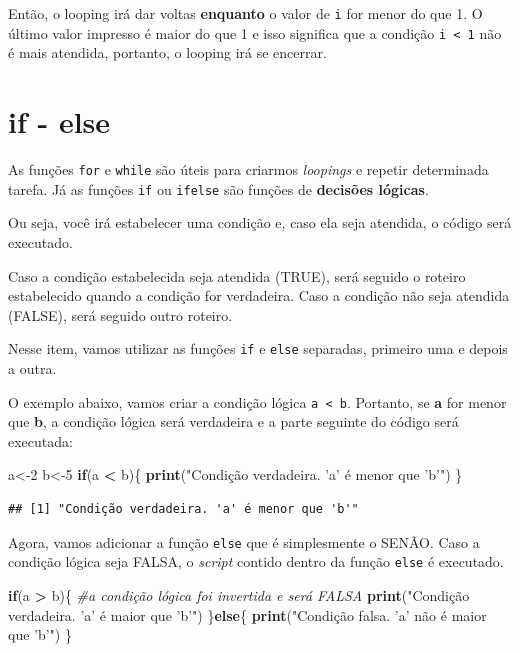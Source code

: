 \documentclass[
]{book}
\newenvironment{Shaded}{\begin{snugshade}}{\end{snugshade}}
\newcommand{\CommentTok}[1]{\textcolor[rgb]{0.56,0.35,0.01}{\textit{#1}}}
\newcommand{\ControlFlowTok}[1]{\textcolor[rgb]{0.13,0.29,0.53}{\textbf{#1}}}
\newcommand{\DecValTok}[1]{\textcolor[rgb]{0.00,0.00,0.81}{#1}}
\newcommand{\KeywordTok}[1]{\textcolor[rgb]{0.13,0.29,0.53}{\textbf{#1}}}
\newcommand{\NormalTok}[1]{#1}
\newcommand{\OperatorTok}[1]{\textcolor[rgb]{0.81,0.36,0.00}{\textbf{#1}}}
\newcommand{\StringTok}[1]{\textcolor[rgb]{0.31,0.60,0.02}{#1}}
\begin{document}
Então, o looping irá dar voltas \textbf{enquanto} o valor de \texttt{i}
for menor do que 1. O último valor impresso é maior do que 1 e isso
significa que a condição \texttt{i\ \textless{}\ 1} não é mais atendida,
portanto, o looping irá se encerrar.

\hypertarget{if---else}{%
\section{if - else}\label{if---else}}

As funções \texttt{for} e \texttt{while} são úteis para criarmos
\emph{loopings} e repetir determinada tarefa. Já as funções \texttt{if}
ou \texttt{ifelse} são funções de \textbf{decisões lógicas}.

Ou seja, você irá estabelecer uma condição e, caso ela seja atendida, o
código será executado.

Caso a condição estabelecida seja atendida (TRUE), será seguido o
roteiro estabelecido quando a condição for verdadeira. Caso a condição
não seja atendida (FALSE), será seguido outro roteiro.

Nesse item, vamos utilizar as funções \texttt{if} e \texttt{else}
separadas, primeiro uma e depois a outra.

O exemplo abaixo, vamos criar a condição lógica
\texttt{a\ \textless{}\ b}. Portanto, se \textbf{a} for menor que
\textbf{b}, a condição lógica será verdadeira e a parte seguinte do
código será executada:

\begin{Shaded}
\begin{Highlighting}[]
\NormalTok{a<-}\DecValTok{2}
\NormalTok{b<-}\DecValTok{5}
\ControlFlowTok{if}\NormalTok{(a }\OperatorTok{<}\StringTok{ }\NormalTok{b)\{}
  \KeywordTok{print}\NormalTok{(}\StringTok{"Condição verdadeira. 'a' é menor que 'b'"}\NormalTok{)}
\NormalTok{\}}
\end{Highlighting}
\end{Shaded}

\begin{verbatim}
## [1] "Condição verdadeira. 'a' é menor que 'b'"
\end{verbatim}

Agora, vamos adicionar a função \texttt{else} que é simplesmente o
SENÃO. Caso a condição lógica seja FALSA, o \emph{script} contido dentro
da função \texttt{else} é executado.

\begin{Shaded}
\begin{Highlighting}[]
\ControlFlowTok{if}\NormalTok{(a }\OperatorTok{>}\StringTok{ }\NormalTok{b)\{ }\CommentTok{#a condição lógica foi invertida e será FALSA}
    \KeywordTok{print}\NormalTok{(}\StringTok{"Condição verdadeira. 'a' é maior que 'b'"}\NormalTok{)}
\NormalTok{\}}\ControlFlowTok{else}\NormalTok{\{}
      \KeywordTok{print}\NormalTok{(}\StringTok{"Condição falsa. 'a' não é maior que 'b'"}\NormalTok{)}
\NormalTok{\}}
\end{Highlighting}
\end{Shaded}
\end{document}
